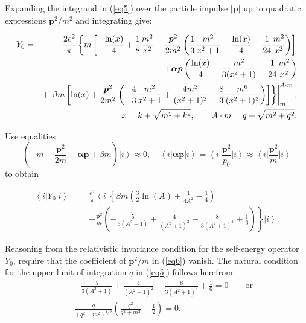 \documentclass[a4paper,draft,showpacs,preprint,prd,aps]{revtex4}
\begin{document}
Expanding the integrand in (\ref{eq5}) over the particle impulse $|{\bm p}|$
up to quadratic expressions ${\bm p}^2/m^2$ and integrating give:



\begin{eqnarray*}
Y_0 & = &\frac{2e^2}\pi\left\{ m\left[
-{\ln(x)\over 4} +\frac 18 \frac{m^2}{x^2}+\frac{{\bm p}^2}{2m^2}\left(
\frac 13 \frac{m^2}{x^2 + 1} - \frac{\ln(x)}4 - \frac 1{24}\frac{m^2}{x^2}
\right)\right]\right. \\
&& +{\bm{\alpha p}}\left(\frac{\ln(x)}4-\frac{m^2}{3(x^2+1)}-
\frac 1{24}\frac{m^2}{x^2}\right) \\
&&+\left.\left.\beta m \left[ \ln(x) + \frac{\bm{p}^2}{2m^2}\left(-\frac 43
\frac{m^2}{x^2 + 1} + \frac{4m^2}{(x^2 + 1)^2} -
\frac 83\frac{m^6}{(x^2 + 1)^3}\right)\right] \right\}\right|_m^{A\cdot m},
\\
&& x=k+\sqrt{m^2+k^2},\qquad A\cdot m=q+\sqrt{m^2+q^2}.
\end{eqnarray*}

Use equalities
\[
\left( -m - \frac{\bm{p}^2}{2m} + \bm{\alpha}\bm{p} + \beta m \right)
\left| i \right\rangle \approx 0,\quad
\left\langle i \right|\bm{\alpha}\bm{p}\left| i\right\rangle =
\left\langle i \right|\frac{\bm{p}^2}{p_0} \left| i\right\rangle \approx
\left\langle i \right|\frac{\bm{p}^2}m\left| {i} \right\rangle
\]
to obtain

\begin{eqnarray}
\label{eq6}
\left\langle i \right| Y_0 \left| i \right\rangle &=&
\frac{e^2}\pi\left\langle i \right|\left\{
\beta m\left( \frac 32 \ln(A) + \frac 1{4A^2} - \frac 14\right)\right.
\nonumber\\
&&+\left.\frac{\bm{p}^2}m\left( -\frac 5{3(A^2 + 1)} +
\frac 4{(A^2 + 1)^2} - \frac 8{3(A^2 + 1)^3} + \frac 16 \right)\right\}
\left| i \right\rangle.
\end{eqnarray}


Reasoning from the relativistic invariance condition for the self-energy
operator $Y_0$, require that the coefficient of $\bm{p}^2/m$ in
(\ref{eq6}) vanish. The natural condition for the upper limit of
integration $q$ in (\ref{eq5}) follows herefrom:
\begin{eqnarray}\label{eq7}
&&-\frac 5{3(A^2 + 1)}+\frac 4{(A^2+1)^2} - \frac 8{3(A^2+1)^3} +
\frac 16 = 0 \qquad \mbox{or} \nonumber\\
&&\frac q{(q^2+m^2)^{1/2}}\left(\frac {q^2}{q^2 + m^2}-\frac 12\right)=0.
\end{eqnarray}
\end{document}
